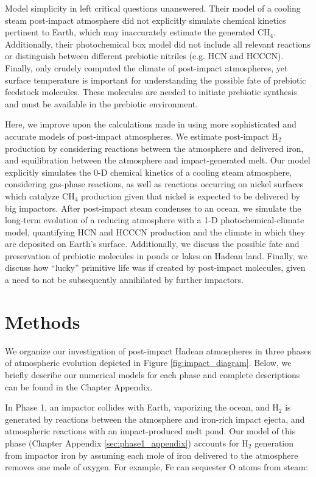 Model simplicity in \citet{Zahnle_2020} left critical questions unanswered. Their model of a cooling steam post-impact atmosphere did not explicitly simulate chemical kinetics pertinent to Earth, which may inaccurately estimate the generated CH$_4$. Additionally, their photochemical box model did not include all relevant reactions or distinguish between different prebiotic nitriles (e.g. HCN and HCCCN). Finally, \citet{Zahnle_2020} only crudely computed the climate of post-impact atmospheres, yet surface temperature is important for understanding the possible fate of prebiotic feedstock molecules. These molecules are needed to initiate prebiotic synthesis and must be available in the prebiotic environment.

Here, we improve upon the calculations made in \citet{Zahnle_2020} using more sophisticated and accurate models of post-impact atmospheres. We estimate post-impact H$_2$ production by considering reactions between the atmosphere and delivered iron, and equilibration between the atmosphere and impact-generated melt. Our model explicitly simulates the 0-D chemical kinetics of a cooling steam atmosphere, considering gas-phase reactions, as well as reactions occurring on nickel surfaces which catalyze CH$_4$ production given that nickel is expected to be delivered by big impactors. After post-impact steam condenses to an ocean, we simulate the long-term evolution of a reducing atmosphere with a 1-D photochemical-climate model, quantifying HCN and HCCCN production and the climate in which they are deposited on Earth's surface. Additionally, we discuss the possible fate and preservation of prebiotic molecules in ponds or lakes on Hadean land. Finally, we discuss how ``lucky'' primitive life was if created by post-impact molecules, given a need to not be subsequently annihilated by further impactors.

\section{Methods}

We organize our investigation of post-impact Hadean atmospheres in three phases of atmospheric evolution depicted in Figure \ref{fig:impact_diagram}. Below, we briefly describe our numerical models for each phase and complete descriptions can be found in the Chapter Appendix.

In Phase 1, an impactor collides with Earth, vaporizing the ocean, and H$_2$ is generated by reactions between the atmosphere and iron-rich impact ejecta, and atmospheric reactions with an impact-produced melt pond. Our model of this phase (Chapter Appendix \ref{sec:phase1_appendix}) accounts for H$_2$ generation from impactor iron by assuming each mole of iron delivered to the atmosphere removes one mole of oxygen. For example, Fe can sequester O atoms from steam:

